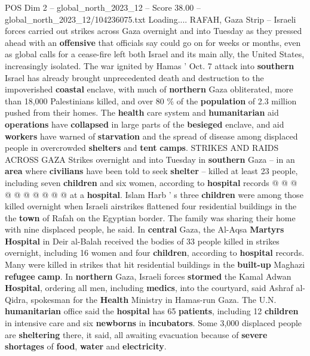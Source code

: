 \begin{textsample}{POS Dim 2 – global\_north\_2023\_12 – Score 38.00 – global\_north\_2023\_12/104236075.txt}  \label{ex:f2_pos_111}
Loading....
RAFAH, Gaza Strip -- Israeli forces carried out strikes across Gaza overnight and into Tuesday as they pressed ahead with an \textbf{offensive} that officials say could go on for weeks or months, even as global calls for a cease-fire left both Israel and its main ally, the United States, increasingly isolated.
The war ignited by Hamas ' Oct. 7 attack into \textbf{southern} Israel has already brought unprecedented death and destruction to the impoverished \textbf{coastal} enclave, with much of \textbf{northern} Gaza obliterated, more than 18,000 Palestinians killed, and over 80 \% of the \textbf{population} of 2.3 million pushed from their homes.
The \textbf{health} care system and \textbf{humanitarian} aid \textbf{operations} have \textbf{collapsed} in large parts of the \textbf{besieged} enclave, and aid \textbf{workers} have warned of \textbf{starvation} and the spread of disease among displaced people in overcrowded \textbf{shelters} and \textbf{tent} \textbf{camps}.
STRIKES AND RAIDS ACROSS GAZA Strikes overnight and into Tuesday in \textbf{southern} Gaza -- in an \textbf{area} where \textbf{civilians} have been told to seek \textbf{shelter} -- killed at least 23 people, including seven \textbf{children} and six women, according to \textbf{hospital} records @ @ @ @ @ @ @ @ @ @ at a \textbf{hospital}.
Islam Harb ' s three \textbf{children} were among those killed overnight when Israeli airstrikes flattened four residential buildings in the the \textbf{town} of Rafah on the Egyptian border.
The family was sharing their home with nine displaced people, he said.
In \textbf{central} Gaza, the Al-Aqsa \textbf{Martyrs} \textbf{Hospital} in Deir al-Balah received the bodies of 33 people killed in strikes overnight, including 16 women and four \textbf{children}, according to \textbf{hospital} records.
Many were killed in strikes that hit residential buildings in the \textbf{built-up} Maghazi \textbf{refugee} \textbf{camp}.
In \textbf{northern} Gaza, Israeli forces \textbf{stormed} the Kamal Adwan \textbf{Hospital}, ordering all men, including \textbf{medics}, into the courtyard, said Ashraf al-Qidra, spokesman for the \textbf{Health} Ministry in Hamas-run Gaza.
The U.N. \textbf{humanitarian} office said the \textbf{hospital} has 65 \textbf{patients}, including 12 \textbf{children} in intensive care and six \textbf{newborns} in \textbf{incubators}.
Some 3,000 displaced people are \textbf{sheltering} there, it said, all awaiting evacuation because of \textbf{severe} \textbf{shortages} of \textbf{food}, \textbf{water} and \textbf{electricity}.

\end{textsample}
